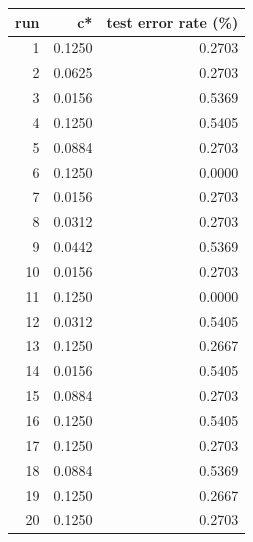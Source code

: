 \begin{tabular}{rrr}
\toprule
run & c* & test error rate (\%) \\
\midrule
1 & 0.1250 & 0.2703 \\
2 & 0.0625 & 0.2703 \\
3 & 0.0156 & 0.5369 \\
4 & 0.1250 & 0.5405 \\
5 & 0.0884 & 0.2703 \\
6 & 0.1250 & 0.0000 \\
7 & 0.0156 & 0.2703 \\
8 & 0.0312 & 0.2703 \\
9 & 0.0442 & 0.5369 \\
10 & 0.0156 & 0.2703 \\
11 & 0.1250 & 0.0000 \\
12 & 0.0312 & 0.5405 \\
13 & 0.1250 & 0.2667 \\
14 & 0.0156 & 0.5405 \\
15 & 0.0884 & 0.2703 \\
16 & 0.1250 & 0.5405 \\
17 & 0.1250 & 0.2703 \\
18 & 0.0884 & 0.5369 \\
19 & 0.1250 & 0.2667 \\
20 & 0.1250 & 0.2703 \\
\bottomrule
\end{tabular}
